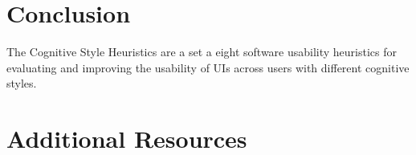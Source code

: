 \section{Conclusion}

The Cognitive Style Heuristics are a set a eight software usability heuristics for evaluating and improving the usability of UIs across users with different cognitive styles.

\nomargins
\section{Additional Resources}

\begin{description}
\item {}
\item {}
\item {}
\item {}
\item {}
\item {}
\item {}
\item {}
\item {}
\item {}
\item {}
\end{description}